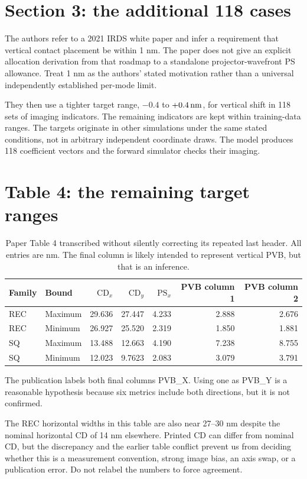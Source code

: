 \section{Section 3: the additional 118 cases}
The authors refer to a 2021 IRDS white paper and infer a requirement
that vertical contact placement be within 1 nm. The paper does not give
an explicit allocation derivation from that roadmap to a standalone
projector-wavefront PS allowance. Treat 1 nm as the authors' stated
motivation rather than a universal independently established per-mode limit.

They then use a tighter target range, $-0.4$ to $+0.4\,\mathrm{nm}$, for vertical
shift in 118 sets of imaging indicators. The remaining indicators are
kept within training-data ranges. The targets originate in other
simulations under the same stated conditions, not in arbitrary independent
coordinate draws. The model produces 118 coefficient vectors and the
forward simulator checks their imaging.

\section{Table 4: the remaining target ranges}
\begin{table}[htbp]\centering\small
\caption{Paper Table 4 transcribed without silently correcting its repeated
last header. All entries are nm. The final column is likely intended to
represent vertical PVB, but that is an inference.}
\begin{tabular}{@{}llrrrrr@{}}
\toprule Family & Bound & $\mathrm{CD}_x$ & $\mathrm{CD}_y$
& $\mathrm{PS}_x$ & PVB column 1 & PVB column 2\\ \midrule
REC & Maximum &29.636&27.447&4.233&2.888&2.676\\
REC & Minimum &26.927&25.520&2.319&1.850&1.881\\
SQ & Maximum &13.488&12.663&4.190&7.238&8.755\\
SQ & Minimum &12.023&9.7623&2.083&3.079&3.791\\
\bottomrule
\end{tabular}
\end{table}
The publication labels both final columns PVB\_X.
Using one as PVB\_Y is a reasonable hypothesis because six metrics include
both directions, but it is not confirmed.

The REC horizontal widths in this table are also near 27--30 nm despite
the nominal horizontal CD of 14 nm elsewhere. Printed CD can differ
from nominal CD, but the discrepancy and the earlier table conflict
prevent us from deciding whether this is a measurement convention,
strong image bias, an axis swap, or a publication error.
Do not relabel the numbers to force agreement.

